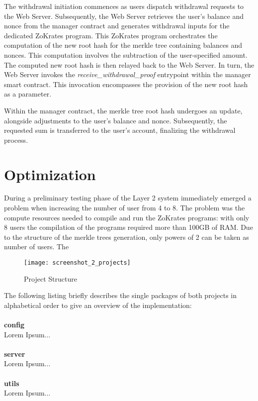   The withdrawal initiation commences as users dispatch withdrawal requests to the Web Server. Subsequently, the Web Server retrieves the user's balance and nonce from the manager contract and generates withdrawal inputs for the dedicated ZoKrates program. This ZoKrates program orchestrates the computation of the new root hash for the merkle tree containing balances and nonces. This computation involves the subtraction of the user-specified amount. The computed new root hash is then relayed back to the Web Server. In turn, the Web Server invokes the \textit{receive\_withdrawal\_proof} entrypoint within the manager smart contract. This invocation encompasses the provision of the new root hash as a parameter.
  
  Within the manager contract, the merkle tree root hash undergoes an update, alongside adjustments to the user's balance and nonce. Subsequently, the requested sum is transferred to the user's account, finalizing the withdrawal process.
  


\section{Optimization}
During a preliminary testing phase of the Layer 2 system immediately emerged a problem when increasing the number of user from 4 to 8. The problem was the compute resources needed to compile and run the ZoKrates programs: with only 8 users the compilation of the programs required more than 100GB of RAM. Due to the structure of the merkle trees generation, only powers of 2 can be taken as number of users. The 

\begin{figure}[htb]
  \centering
  \texttt{[image: screenshot\_2\_projects]}
  \caption{Project Structure}
  \label{fig:projects}
\end{figure}

\noindent
The following listing briefly describes the single packages of both projects in alphabetical order to give an overview of the implementation:
\\
\\
\textbf{config} 
\\
Lorem Ipsum...
\\
\\
\textbf{server} 
\\
Lorem Ipsum...
\\
\\
\textbf{utils} 
\\
Lorem Ipsum...

